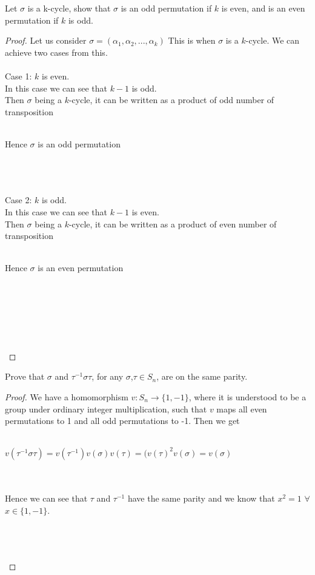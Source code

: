 \documentclass[12pt]{article}
\newenvironment{problem}[2][Problem]{\begin{trivlist}
\item[\hskip \labelsep {\bfseries #1}\hskip \labelsep {\bfseries #2.}]}{\end{trivlist}}
\begin{document}
\begin{problem}{3.3.2}
Let $\sigma$ is a k-cycle, show that $\sigma$ is an odd permutation if $k$ is even, and is an even permutation if $k$ is odd.
\end{problem}

\begin{proof}
Let us consider $\sigma = (\alpha_1, \alpha_2,..., \alpha_k)$ This is when $\sigma$ is a $k$-cycle. We can achieve two cases from this. \\ \\ 
Case 1: $k$ is even. \\
In this case we can see that $k-1$ is odd. \\
Then $\sigma$ being a $k$-cycle, it can be written as a product of odd number of transposition \\ \\
\centerline{Hence $\sigma$ is an odd permutation} \\ \\ \\
Case 2: $k$ is odd. \\ 
In this case we can see that $k-1$ is even. \\
Then $\sigma$ being a $k$-cycle, it can be written as a product of even number of transposition \\ \\
\centerline{Hence $\sigma$ is an even permutation} \\ \\ \\
\centerline{} \\ \\
\end{proof}

\begin{problem}{3.3.3}
Prove that $\sigma$ and $\tau^{-1} \sigma \tau$, for any $\sigma$,$\tau \in S_n$, are on the same parity. 
\end{problem}

\begin{proof}
We have a homomorphism $v: S_n \rightarrow \{1,-1\}$, where it is understood to be a group under ordinary integer multiplication, such that $v$ maps all even permutations to 1 and all odd permutations to -1. Then we get \\ \\
\centerline{$v(\tau^{-1}\sigma \tau) = v(\tau^{-1})v(\sigma)v(\tau)=(v(\tau)^2v(\sigma)=v(\sigma)$} \\ \\
Hence we can see that $\tau$ and $\tau^{-1}$ have the same parity and we know that $x^2 = 1$ $\forall$ $x \in \{1,-1\}$. \\ \\
\centerline{} \\ \\
\end{proof}
 
\end{document}
